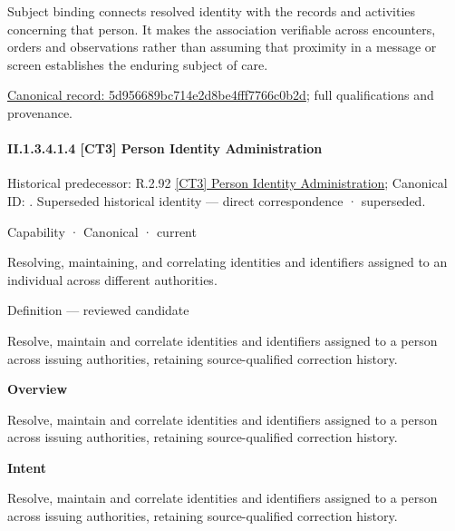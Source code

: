Subject binding connects resolved identity with the records and activities concerning that person. It makes the association verifiable across encounters, orders and observations rather than assuming that proximity in a message or screen establishes the enduring subject of care.


{\footnotesize \href{../../../../continuum/strategy/capability/feature/5d956689bc714e2d8be4fff7766c0b2d.md}{Canonical record: 5d956689bc714e2d8be4fff7766c0b2d}; full qualifications and provenance.}\par
\paragraph*{II.1.3.4.1.4 [CT3] Person Identity Administration}
\label{navigation:II.1.3.4.1.4}

{\small Historical predecessor: R.2.92 \hyperref[element:7550fd5b17e643118fa76d2616e1ba20]{[CT3] Person Identity Administration}; Canonical ID: \texttt{}. Superseded historical identity — direct correspondence · superseded.}\par
\label{element:6c3de7750ef1436cad6a9533731782b6}
{\small Capability · Canonical · current}\par

Resolving, maintaining, and correlating identities and identifiers assigned to an individual across different authorities.



Definition — reviewed candidate



Resolve, maintain and correlate identities and identifiers assigned to a person across issuing authorities, retaining source-qualified correction history.



\textbf{Overview}



Resolve, maintain and correlate identities and identifiers assigned to a person across issuing authorities, retaining source-qualified correction history.



\textbf{Intent}



Resolve, maintain and correlate identities and identifiers assigned to a person across issuing authorities, retaining source-qualified correction history.



